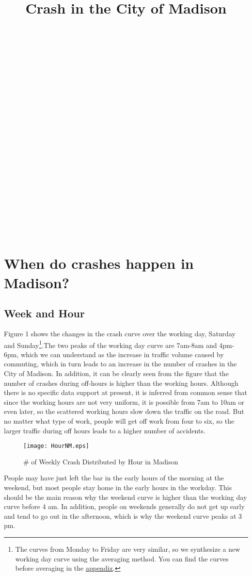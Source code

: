 \documentclass[15pt]{article}
\begin{document}
\title{Crash in the City of Madison}
\author{}
\date{}
\maketitle

\newpage
~\\
~\\
~\\
~\\
~\\
~\\
~\\
~\\
~\\
~\\
~\\
~\\
~\\
~\\
~\\
~\\
~\\
~\\
~\\
~\\
\section[20pt]{When do crashes happen in Madison?}

\newpage
\subsection{Week and Hour}
\label{sec:WH}
Figure 1 shows the changes in the crash curve over the working day, Saturday and Sunday\footnote{The curves from Monday to Friday are very similar, so we synthesize a new working day curve using the averaging method. You can find the curves before averaging in the \hyperref[sec:WH1]{\color{blue} \underline {appendix}}.}.The two peaks of the working day curve are 7am-8am and 4pm-6pm, which we can understand as the increase in traffic volume caused by commuting, which in turn leads to an increase in the number of crashes in the City of Madison. In addition, it can be clearly seen from the figure that the number of crashes during off-hours is higher than the working hours. Although there is no specific data support at present, it is inferred from common sense that since the working hours are not very uniform, it is possible from 7am to 10am or even later, so the scattered working hours slow down the traffic on the road. But no matter what type of work, people will get off work from four to six, so the larger traffic during off hours leads to a higher number of accidents.
\begin{figure}[H]
\flushleft
\texttt{[image: HourNM.eps]}
\caption{\# of Weekly Crash Distributed by Hour in Madison}
\label{1}
\end{figure}
People may have just left the bar in the early hours of the morning at the weekend, but most people stay home in the early hours in the workday. This should be the main reason why the weekend curve is higher than the working day curve before 4 am. In addition, people on weekends generally do not get up early and tend to go out in the afternoon, which is why the weekend curve peaks at 3 pm.
\end{document}
